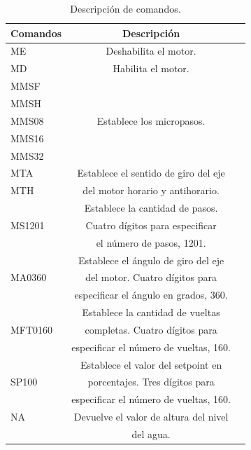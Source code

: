 \begin{table}[H]
\centering
\caption[Descripción de comandos]{Descripción de comandos.}
\begin{tabular}{l c c}
\toprule
\textbf{Comandos} & \textbf{Descripción} \\
\midrule
ME & Deshabilita el motor.\\
MD & Habilita el motor. \\
\midrule
MMSF \\
MMSH \\
MMS08 & Establece los micropasos.\\
MMS16\\
MMS32\\
\midrule
MTA & Establece el sentido de giro del eje\\
MTH & del motor horario y antihorario.\\
\midrule
       & Establece la cantidad de pasos.\\
MS1201 & Cuatro dígitos para especificar\\
       & el número de pasos, 1201.\\
\midrule
       & Establece el ángulo de giro del eje\\ 
MA0360 & del motor. Cuatro dígitos para\\
       &  especificar el ángulo en grados, 360.\\
\midrule
        & Establece la cantidad de vueltas \\ 
MFT0160 & completas. Cuatro dígitos para  \\
        & especificar el número de vueltas, 160.\\
\midrule
        & Establece el valor del setpoint en \\ 
SP100   & porcentajes. Tres dígitos para\\
        & especificar el número de vueltas, 160.\\
\midrule
NA & Devuelve el valor de altura del nivel\\
   &    	      del agua.\\
\bottomrule
\hline
\end{tabular}
\label{tab:descripción de comandos}
\end{table}

